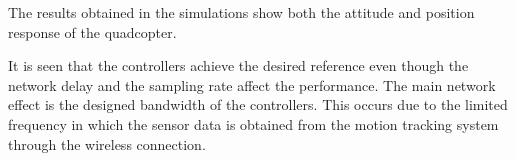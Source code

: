 The results obtained in the simulations show both the attitude and position response of the quadcopter. 

It is seen that the controllers achieve the desired reference even though the network delay and the sampling rate affect the performance. The main network effect is the designed bandwidth of the controllers. This occurs due to the limited frequency in which the sensor data is obtained from the motion tracking system through the wireless connection. 

